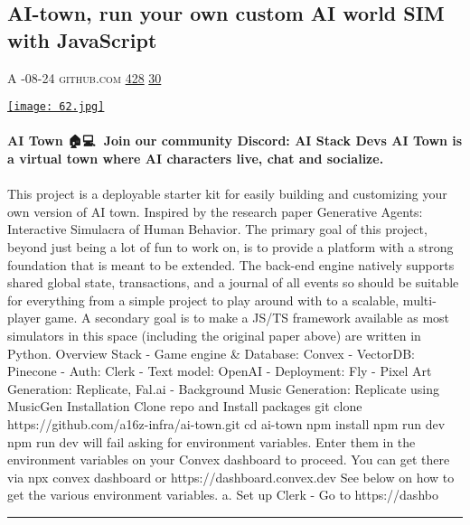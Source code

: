 \documentclass[10pt,a4paper]{article}
\begin{document}
\begin{multicols}{2}

\noindent\begin{minipage}{\linewidth}
\subsection{AI-town, run your own custom AI world SIM with JavaScript}
\textsc{\footnotesize
{\scriptsize\faUser}\space 
A 
{\scriptsize\faCalendar}-08-24 
{\scriptsize\faGithub}\space 
github.com 
{\scriptsize\faThumbsOUp}\space 
\href{http://news.ycombinator.com/item?id=37128293\&utm\_term=comment}{428} 
{\scriptsize\faComments}\space 
\href{http://news.ycombinator.com/item?id=37128293\&utm\_term=comment}{30} 
}
\par\medskip\noindent
\href{https://github.com/a16z-infra/ai-town?utm\_source=hackernewsletter\&utm\_medium=email\&utm\_term=fun}{
    \texttt{[image: 62.jpg]}
}
\end{minipage}
\paragraph{}
\textbf{AI Town 🏠💻💌
Join our community Discord: AI Stack Devs
AI Town is a virtual town where AI characters live, chat and socialize.}
\paragraph{}

This project is a deployable starter kit for easily building and customizing your own version of AI town. Inspired by the research paper Generative Agents: Interactive Simulacra of Human Behavior.
The primary goal of this project, beyond just being a lot of fun to work on, is to provide a platform with a strong foundation that is meant to be extended. The back-end engine natively supports shared global state, transactions, and a journal of all events so should be suitable for everything from a simple project to play around with to a scalable, multi-player game. A secondary goal is to make a JS/TS framework available as most simulators in this space (including the original paper above) are written in Python.
Overview
Stack
- Game engine \& Database: Convex
- VectorDB: Pinecone
- Auth: Clerk
- Text model: OpenAI
- Deployment: Fly
- Pixel Art Generation: Replicate, Fal.ai
- Background Music Generation: Replicate using MusicGen
Installation
Clone repo and Install packages
git clone https://github.com/a16z-infra/ai-town.git cd ai-town npm install npm run dev
npm run dev will fail asking for environment variables.
Enter them in the environment variables on your Convex dashboard to proceed.
You can get there via
npx convex dashboard or https://dashboard.convex.dev
See below on how to get the various environment variables.
a. Set up Clerk
- Go to https://dashbo
\par\noindent\textcolor{red}{\rule{\linewidth}{0.2mm}}
\vfill
\null
\noindent\begin{minipage}{\linewidth}

\end{minipage}
\end{multicols}
\end{document}
